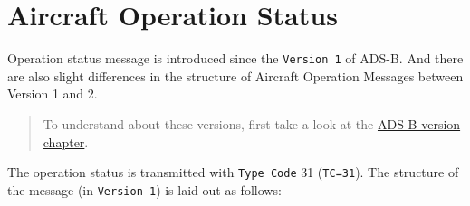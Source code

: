 \section{Aircraft Operation Status}\label{aircraft-operation-status}

Operation status message is introduced since the \texttt{Version\ 1} of
ADS-B. And there are also slight differences in the structure of
Aircraft Operation Messages between Version 1 and 2.

\begin{quote}
To understand about these versions, first take a look at the
\href{version.html}{ADS-B version chapter}.
\end{quote}

The operation status is transmitted with \texttt{Type\ Code} 31
(\texttt{TC=31}). The structure of the message (in \texttt{Version\ 1})
is laid out as follows:

